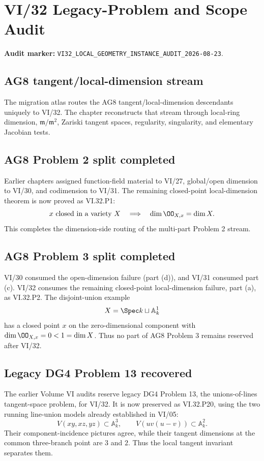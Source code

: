 \chapter*{VI/32 Legacy-Problem and Scope Audit}
\label{audit:vi32}

\textbf{Audit marker:} \texttt{VI32\_LOCAL\_GEOMETRY\_INSTANCE\_AUDIT\_2026-08-23}.

\section*{AG8 tangent/local-dimension stream}
The migration atlas routes the AG8 tangent/local-dimension descendants uniquely to VI/32.
The chapter reconstructs that stream through local-ring dimension, $\mathfrak m/\mathfrak m^2$,
Zariski tangent spaces, regularity, singularity, and elementary Jacobian tests.

\section*{AG8 Problem 2 split completed}
Earlier chapters assigned function-field material to VI/27, global/open dimension to VI/30, and codimension to VI/31.
The remaining closed-point local-dimension theorem is now proved as VI.32.P1:
\[
 x\text{ closed in a variety }X\quad\Longrightarrow\quad\dim\OO_{X,x}=\dim X.
\]
This completes the dimension-side routing of the multi-part Problem 2 stream.

\section*{AG8 Problem 3 split completed}
VI/30 consumed the open-dimension failure (part (d)), and VI/31 consumed part (c).
VI/32 consumes the remaining closed-point local-dimension failure, part (a), as VI.32.P2.
The disjoint-union example
\[
 X=\Spec k\sqcup\mathbb A^1_k
\]
has a closed point $x$ on the zero-dimensional component with $\dim\OO_{X,x}=0<1=\dim X$.
Thus no part of AG8 Problem 3 remains reserved after VI/32.

\section*{Legacy DG4 Problem 13 recovered}
The earlier Volume VI audits reserve legacy DG4 Problem 13, the unions-of-lines tangent-space problem,
for VI/32.  It is now preserved as VI.32.P20,
using the two running line-union models already established in VI/05:
\[
 V(xy,xz,yz)\subset\mathbb A^3_k,
 \qquad
 V(uv(u-v))\subset\mathbb A^2_k.
\]
Their component-incidence pictures agree, while their tangent dimensions at the common
three-branch point are $3$ and $2$.  Thus the local tangent invariant separates them.

